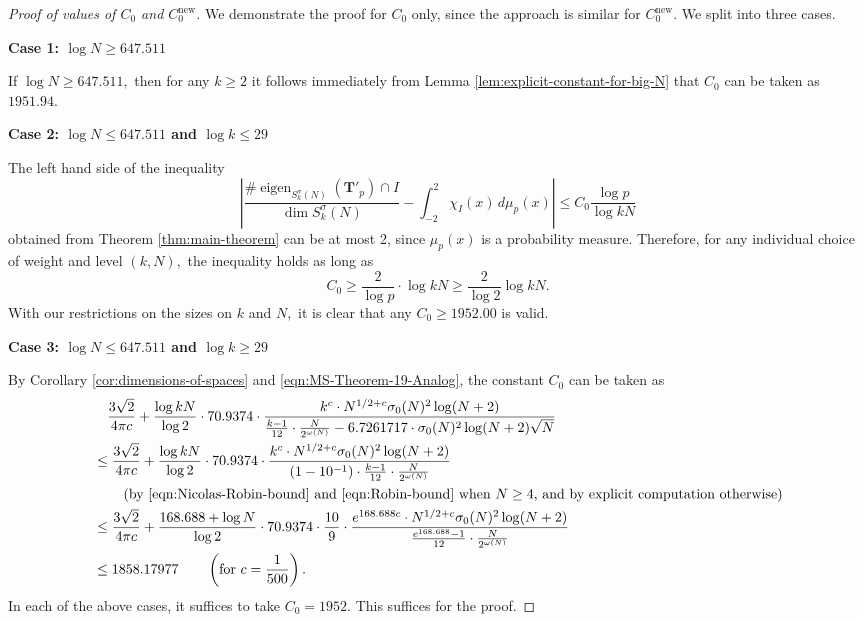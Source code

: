 \documentclass[11pt,letterpaper,reqno]{amsart}
\theoremstyle{definition}
\numberwithin{equation}{section}
\numberwithin{figure}{section}
\numberwithin{table}{section}
\newcommand{\nw}{\mathrm{new}}
\begin{document}
\begin{proof}[Proof of values of $C_0$ and $C_0^\nw$]
    We demonstrate the proof for $C_0$ only, since the approach is similar for $C_0^\nw$. We split into three cases.

    \textbf{Case 1: $\log N \geq 647.511$}

    If $\log N \geq 647.511,$ then for any $k \geq 2$ it follows immediately from Lemma \ref{lem:explicit-constant-for-big-N} that $C_0$ can be taken as $1951.94.$

    \textbf{Case 2: $\log N \leq 647.511$ and $\log k \leq 29$}

    The left hand side of the inequality
    $$\left| \frac{\# \operatorname{eigen}_{S_k^{\sigma}(N)}(\mathbf{T}'_p) \cap I}{\dim S_k^{\sigma}(N)} - \int_{-2}^2 \chi_I(x) \, d \mu_p(x)  \right| \le C_0  \frac{\log p}{\log kN}$$
    obtained from Theorem \ref{thm:main-theorem} can be at most 2, since $\mu_p(x)$ is a probability measure. Therefore, for any individual choice of weight and level $(k, N),$ the inequality holds as long as
    $$C_0 \geq \frac{2}{\log p} \cdot \log kN \geq \frac{2}{\log 2} \log kN.$$
    With our restrictions on the sizes on $k$ and $N,$ it is clear that any $C_0 \geq 1952.00$ is valid.

    \textbf{Case 3: $\log N \leq 647.511$ and $\log k \geq 29$}

    By Corollary \ref{cor:dimensions-of-spaces} and \eqref{eqn:MS-Theorem-19-Analog}, the constant $C_0$ can be taken as
    \begin{align}
        &\quad \frac{3\sqrt{2}}{4\pi c} + \frac{\log kN}{\log 2} \cdot 70.9374 \cdot \frac{k^c \cdot N^{1/2 + c} \sigma_0(N)^2 \log (N + 2)}{\frac{k - 1}{12} \cdot \frac{N}{2^{\omega(N)}} - 6.7261717 \cdot \sigma_0(N)^2 \log(N + 2) \sqrt{N}}\\
        &\leq \frac{3\sqrt{2}}{4\pi c} + \frac{\log kN}{\log 2} \cdot 70.9374 \cdot \frac{k^c \cdot N^{1/2 + c} \sigma_0(N)^2 \log (N + 2)}{\left( 1 - 10^{-1} \right) \cdot \frac{k - 1}{12} \cdot \frac{N}{2^{\omega(N)}}}\\
        &\qquad \left( \text{by \eqref{eqn:Nicolas-Robin-bound} and \eqref{eqn:Robin-bound} when $N \geq 4$, and by explicit computation otherwise} \right)\\
        &\leq \frac{3\sqrt{2}}{4\pi c} + \frac{168.688 + \log N}{\log 2} \cdot 70.9374 \cdot \frac{10}{9} \cdot \frac{e^{168.688c} \cdot N^{1/2 + c} \sigma_0(N)^2 \log (N + 2)}{ \frac{e^{168.688} - 1}{12} \cdot \frac{N}{2^{\omega(N)}}}  \\
        &\leq 1858.17977 \qquad \left( \text{for $c = \frac{1}{500}$}  \right).
    \end{align}
    In each of the above cases, it suffices to take $C_0 = 1952$. This suffices for the proof.
\end{proof}
\end{document}

